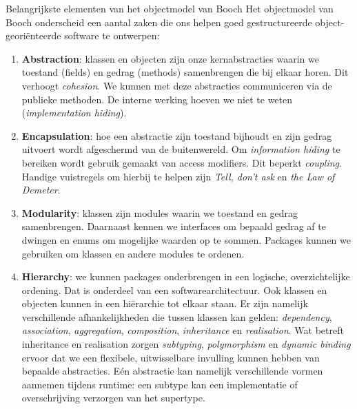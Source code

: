 \begin{defbox}{Belangrijkste elementen van het objectmodel van Booch}
    Het objectmodel van Booch onderscheid een aantal zaken
    die ons helpen goed gestructureerde object-georiënteerde software te ontwerpen:
    \begin{enumerate}
        \item \textbf{Abstraction}: klassen en objecten zijn onze kernabstracties waarin we 
        toestand (fields) en gedrag (methods) samenbrengen die bij elkaar horen. Dit verhoogt \textit{cohesion}.
        We kunnen met deze abstracties 
        communiceren via de publieke methoden. De interne werking hoeven we niet te weten (\textit{implementation hiding}).
        \item \textbf{Encapsulation}: hoe een abstractie zijn toestand bijhoudt en zijn 
        gedrag uitvoert wordt afgeschermd van de buitenwereld. Om \textit{information hiding} te bereiken wordt 
        gebruik gemaakt van access modifiers. Dit beperkt \textit{coupling}. Handige vuistregels om hierbij te helpen 
        zijn \textit{Tell, don't ask} en \textit{the Law of Demeter}.
        \item \textbf{Modularity}: klassen zijn modules waarin we toestand en gedrag samenbrengen. Daarnaast kennen 
        we interfaces om bepaald gedrag af te dwingen en enums om mogelijke waarden op te sommen. 
        Packages kunnen we gebruiken om klassen en andere modules te ordenen.
        \item \textbf{Hierarchy}: we kunnen packages onderbrengen in een logische, overzichtelijke ordening. Dat is onderdeel 
        van een softwarearchitectuur. Ook klassen en objecten kunnen in een hiërarchie tot elkaar staan. Er zijn namelijk 
        verschillende afhankelijkheden die tussen klassen kan gelden: \textit{dependency}, \textit{association}, \textit{aggregation},
        \textit{composition}, \textit{inheritance} en \textit{realisation}. Wat betreft inheritance en realisation zorgen 
        \textit{subtyping}, \textit{polymorphism} en \textit{dynamic binding} ervoor dat we een flexibele, uitwisselbare 
        invulling kunnen hebben van bepaalde abstracties. Eén abstractie kan namelijk verschillende vormen aannemen tijdens runtime:
        een subtype kan een implementatie of overschrijving verzorgen van het supertype.
    \end{enumerate}
\end{defbox}